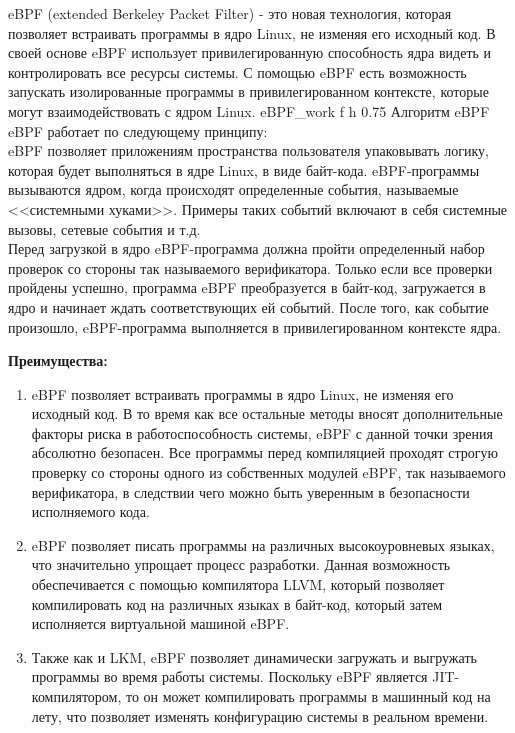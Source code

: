 eBPF (extended Berkeley Packet Filter) - это новая технология, которая позволяет встраивать программы в ядро Linux, не изменяя его исходный код.
В своей основе eBPF использует привилегированную способность ядра видеть и контролировать все ресурсы системы.
С помощью eBPF есть возможность запускать изолированные программы в привилегированном контексте, которые могут взаимодействовать с ядром Linux.
{eBPF_work} %
{f}
{h}
{0.75\textwidth} %
{Алгоритм eBPF} %
\vspace{1mm}\\

eBPF работает по следующему принципу:\\%

eBPF позволяет приложениям пространства пользователя упаковывать логику, которая будет выполняться в ядре Linux, в виде байт-кода.
eBPF-программы вызываются ядром, когда происходят определенные события, называемые <<системными хуками>>.
Примеры таких событий включают в себя системные вызовы, сетевые события и т.д.\\
Перед загрузкой в ядро eBPF-программа должна пройти определенный набор проверок со стороны так называемого верификатора.
Только если все проверки пройдены успешно, программа eBPF преобразуется в байт-код, загружается в ядро и начинает ждать соответствующих ей событий.
После того, как событие произошло, eBPF-программа выполняется в привилегированном контексте ядра.

\textbf{Преимущества:}

\begin{enumerate}
    \item eBPF позволяет встраивать программы в ядро Linux, не изменяя его исходный код.
	    В то время как все остальные методы вносят дополнительные факторы риска в работоспособность системы, eBPF с данной точки зрения абсолютно безопасен.
        Все программы перед компиляцией проходят строгую проверку со стороны одного из собственных модулей eBPF, так называемого верификатора, в следствии чего можно быть уверенным в безопасности исполняемого кода.
    \item eBPF позволяет писать программы на различных высокоуровневых языках, что значительно упрощает процесс разработки.
    Данная возможность обеспечивается с помощью компилятора LLVM, который позволяет компилировать код на различных языках в байт-код, который затем исполняется виртуальной машиной eBPF.
    \item Также как и LKM, eBPF позволяет динамически загружать и выгружать программы во время работы системы. %
    Поскольку eBPF является JIT-компилятором, то он может компилировать программы в машинный код на лету, что позволяет изменять конфигурацию системы в реальном времени.
\end{enumerate}

